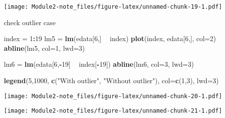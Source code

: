 \documentclass[]{article}
\newenvironment{Shaded}{\begin{snugshade}}{\end{snugshade}}
\newcommand{\KeywordTok}[1]{\textcolor[rgb]{0.13,0.29,0.53}{\textbf{#1}}}
\newcommand{\DataTypeTok}[1]{\textcolor[rgb]{0.13,0.29,0.53}{#1}}
\newcommand{\DecValTok}[1]{\textcolor[rgb]{0.00,0.00,0.81}{#1}}
\newcommand{\StringTok}[1]{\textcolor[rgb]{0.31,0.60,0.02}{#1}}
\newcommand{\OperatorTok}[1]{\textcolor[rgb]{0.81,0.36,0.00}{\textbf{#1}}}
\newcommand{\NormalTok}[1]{#1}
\begin{document}
\texttt{[image: Module2-note\_files/figure-latex/unnamed-chunk-19-1.pdf]}

check outlier case

\begin{Shaded}
\begin{Highlighting}[]
\NormalTok{index =}\StringTok{ }\DecValTok{1}\OperatorTok{:}\DecValTok{19}
\NormalTok{lm5 =}\StringTok{ }\KeywordTok{lm}\NormalTok{(edata[}\DecValTok{6}\NormalTok{,] }\OperatorTok{~}\StringTok{ }\NormalTok{index)}
\KeywordTok{plot}\NormalTok{(index, edata[}\DecValTok{6}\NormalTok{,], }\DataTypeTok{col=}\DecValTok{2}\NormalTok{)}
\KeywordTok{abline}\NormalTok{(lm5, }\DataTypeTok{col=}\DecValTok{1}\NormalTok{, }\DataTypeTok{lwd=}\DecValTok{3}\NormalTok{)}

\NormalTok{lm6 =}\StringTok{ }\KeywordTok{lm}\NormalTok{(edata[}\DecValTok{6}\NormalTok{,}\OperatorTok{-}\DecValTok{19}\NormalTok{] }\OperatorTok{~}\StringTok{ }\NormalTok{index[}\OperatorTok{-}\DecValTok{19}\NormalTok{])}
\KeywordTok{abline}\NormalTok{(lm6, }\DataTypeTok{col=}\DecValTok{3}\NormalTok{, }\DataTypeTok{lwd=}\DecValTok{3}\NormalTok{)}

\KeywordTok{legend}\NormalTok{(}\DecValTok{5}\NormalTok{,}\DecValTok{1000}\NormalTok{, }\KeywordTok{c}\NormalTok{(}\StringTok{"With outlier"}\NormalTok{, }\StringTok{"Without outlier"}\NormalTok{), }\DataTypeTok{col=}\KeywordTok{c}\NormalTok{(}\DecValTok{1}\NormalTok{,}\DecValTok{3}\NormalTok{), }\DataTypeTok{lwd=}\DecValTok{3}\NormalTok{)}
\end{Highlighting}
\end{Shaded}

\texttt{[image: Module2-note\_files/figure-latex/unnamed-chunk-20-1.pdf]}

\begin{Shaded}
\end{Shaded}

\texttt{[image: Module2-note\_files/figure-latex/unnamed-chunk-21-1.pdf]}

\begin{Shaded}
\end{Shaded}
\end{document}
